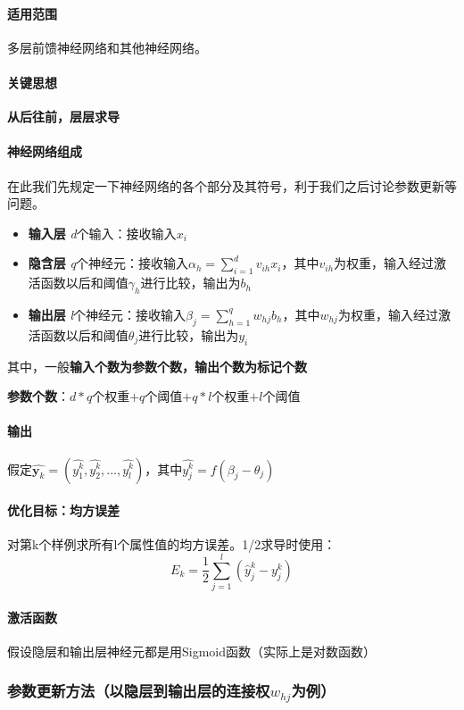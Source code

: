 \documentclass[UTF8]{ctexart}
\begin{document}
\paragraph{适用范围}
多层前馈神经网络和其他神经网络。
\paragraph{关键思想}
{\bfseries 从后往前，层层求导}
\paragraph{神经网络组成}
在此我们先规定一下神经网络的各个部分及其符号，利于我们之后讨论参数更新等问题。
\begin{itemize}
	\item {\bfseries 输入层} \emph{d}个输入：接收输入$x_i$
	\item {\bfseries 隐含层} \emph{q}个神经元：接收输入$\alpha_h = \sum_{i=1}^dv_{ih}x_i$，其中$v_{ih}$为权重，输入经过激活函数以后和阈值$\gamma_h$进行比较，输出为$b_h$
	\item {\bfseries 输出层} \emph{l}个神经元：接收输入$\beta_j = \sum_{h=1}^qw_{hj}b_h$，其中$w_{hj}$为权重，输入经过激活函数以后和阈值$\theta_j$进行比较，输出为$y_i$
\end{itemize}
\par
其中，一般{\bfseries 输入个数为参数个数，输出个数为标记个数}
\par
{\bfseries 参数个数}：$d*q$个权重$+q$个阈值$+q*l$个权重$+l$个阈值
\paragraph{输出}
假定$\hat{\pmb {y}_k} = (\hat{y_1^k}, \hat{y_2^k}, ..., \hat{y_l^k})$，其中$\hat{y_j^k} = f(\beta_j - \theta_j)$
\paragraph{优化目标：均方误差}
对第k个样例求所有l个属性值的均方误差。1/2求导时使用：$$E_k = \frac{1}{2}\sum_{j=1}^l(\hat{y}_j^k - {y_j^k})$$
\paragraph{激活函数}
假设隐层和输出层神经元都是用Sigmoid函数（实际上是对数函数）

\subsubsection{参数更新方法（以隐层到输出层的连接权$w_{hj}$为例）}
\end{document}
